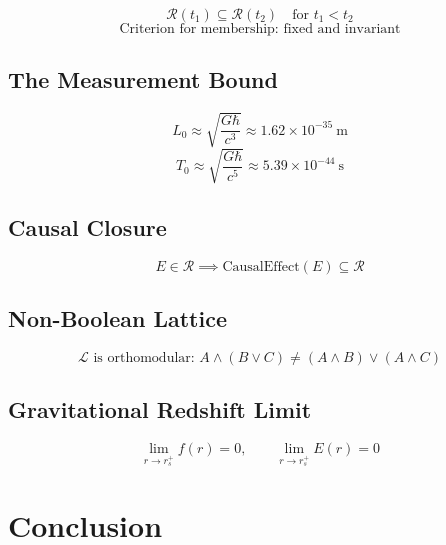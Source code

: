 \documentclass[aps,preprint,showpacs,showkeys]{revtex4}%
\begin{document}
\begin{equation}
\mathcal{R}(t_1) \subseteq \mathcal{R}(t_2) \quad \text{for } t_1 < t_2
\end{equation}
\begin{equation}
\text{Criterion for membership: fixed and invariant}
\end{equation}

\subsection{The Measurement Bound}

\begin{equation}
L_0 \approx \sqrt{\frac{G\hbar}{c^3}} \approx 1.62 \times 10^{-35}\ \text{m}
\end{equation}
\begin{equation}
T_0 \approx \sqrt{\frac{G\hbar}{c^5}} \approx 5.39 \times 10^{-44}\ \text{s}
\end{equation}

\subsection{Causal Closure}

\begin{equation}
E \in \mathcal{R} \implies \text{CausalEffect}(E) \subseteq \mathcal{R}
\end{equation}

\subsection{Non-Boolean Lattice}

\begin{equation}
\mathcal{L} \text{ is orthomodular: } A \wedge (B \vee C) \neq (A \wedge B)
\vee (A \wedge C)
\end{equation}

\subsection{Gravitational Redshift Limit}

\begin{equation}
\lim_{r \to r_s^+} f(r) = 0, \qquad \lim_{r \to r_s^+} E(r) = 0
\end{equation}

\section{Conclusion}
\end{document}

